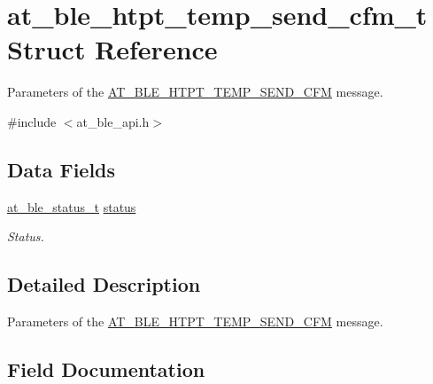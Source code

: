 \hypertarget{structat__ble__htpt__temp__send__cfm__t}{}\section{at\+\_\+ble\+\_\+htpt\+\_\+temp\+\_\+send\+\_\+cfm\+\_\+t Struct Reference}
\label{structat__ble__htpt__temp__send__cfm__t}


Parameters of the \mbox{\hyperlink{at__ble__api_8h_a3324640b95f33169515f89738ed5baeba918f0b91ca899278bb08d41cf98cb005}{A\+T\+\_\+\+B\+L\+E\+\_\+\+H\+T\+P\+T\+\_\+\+T\+E\+M\+P\+\_\+\+S\+E\+N\+D\+\_\+\+C\+FM}} message.  




{\ttfamily \#include $<$at\+\_\+ble\+\_\+api.\+h$>$}

\subsection*{Data Fields}
\begin{DoxyCompactItemize}
\item 
\mbox{\hyperlink{group__error__codes__group_ga3b1db9b95feb157b3c188ca27fe76988}{at\+\_\+ble\+\_\+status\+\_\+t}} \mbox{\hyperlink{structat__ble__htpt__temp__send__cfm__t_a0b48093fc2030779fc47e5216f8019e2}{status}}
\begin{DoxyCompactList}\small\item\em Status. \end{DoxyCompactList}\end{DoxyCompactItemize}


\subsection{Detailed Description}
Parameters of the \mbox{\hyperlink{at__ble__api_8h_a3324640b95f33169515f89738ed5baeba918f0b91ca899278bb08d41cf98cb005}{A\+T\+\_\+\+B\+L\+E\+\_\+\+H\+T\+P\+T\+\_\+\+T\+E\+M\+P\+\_\+\+S\+E\+N\+D\+\_\+\+C\+FM}} message. 

\subsection{Field Documentation}
\mbox{\label{structat__ble__htpt__temp__send__cfm__t_a0b48093fc2030779fc47e5216f8019e2}} 
